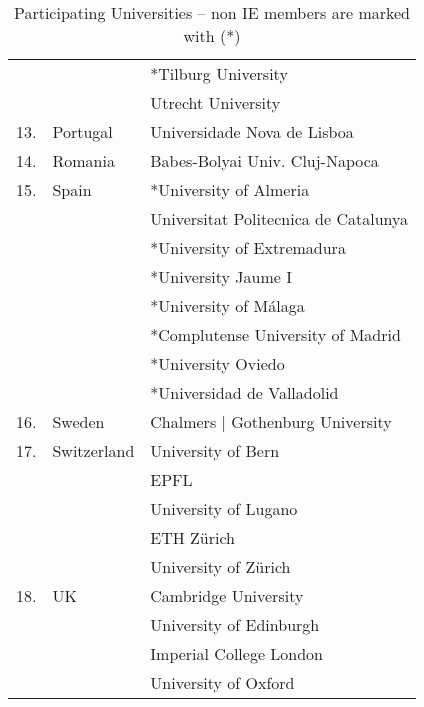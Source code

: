 \begin{table}
\begin{center}
\begin{tabular}  {|r|l|l|}
& & *Tilburg University \\   
& &  Utrecht University \\
 \hline
13.& Portugal  & Universidade Nova de Lisboa \\
 \hline
14.&Romania  & Babes-Bolyai Univ. Cluj-Napoca \\
\hline
15.&Spain  & *University of Almeria \\
&  & Universitat Politecnica de Catalunya \\
&  &  *University of Extremadura\\
&  &  *University Jaume I\\
&    & *University of M\' alaga \\
&  &  *Complutense University of Madrid\\
&  &  *University Oviedo\\
&  & *Universidad de Valladolid \\
\hline
16.& Sweden   &  Chalmers | Gothenburg University\\
\hline
17.&Switzerland   & University of Bern\\
& & EPFL \\
&  &  University of Lugano \\
 &    & ETH Z\" urich \\
&   &  University of Z\" urich\\
\hline
18.&UK   &  Cambridge University\\
&   &  University of Edinburgh\\
 &  & Imperial College London\\
&  & University of Oxford \\
\hline
\end{tabular}
\vspace*{0.4cm}
\end{center}
\caption{Participating Universities -- non IE members are marked with (*)}
\label{tab:names}
\end{table}

